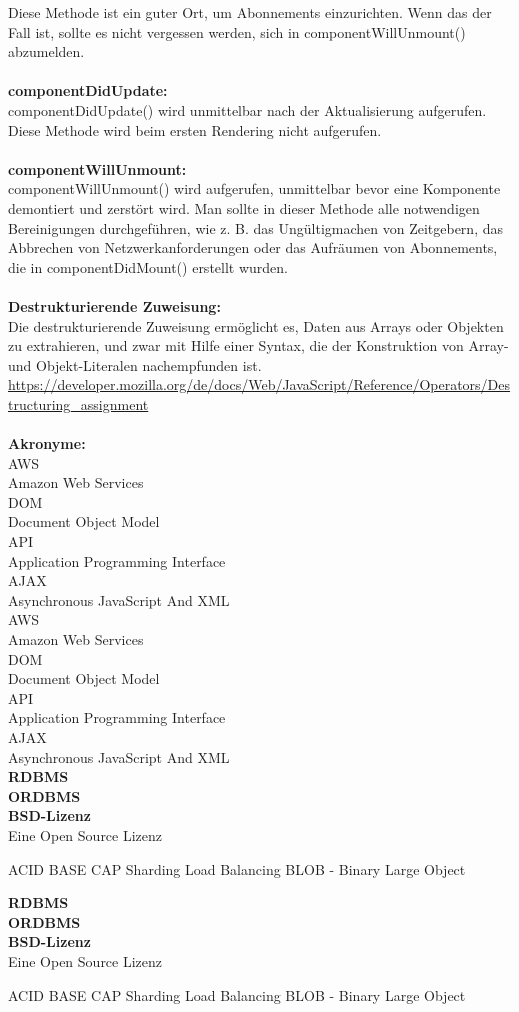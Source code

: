 Diese Methode ist ein guter Ort, um Abonnements einzurichten. Wenn das der Fall ist, sollte es nicht vergessen werden, sich in componentWillUnmount() abzumelden.
\\\\
\textbf{componentDidUpdate:}\\
componentDidUpdate() wird unmittelbar nach der Aktualisierung aufgerufen. Diese Methode wird beim ersten Rendering nicht aufgerufen.
\\\\
\textbf{componentWillUnmount:}\\
componentWillUnmount() wird aufgerufen, unmittelbar bevor eine Komponente demontiert und zerstört wird. Man sollte in dieser Methode alle notwendigen Bereinigungen durchgeführen, wie z. B. das Ungültigmachen von Zeitgebern, das Abbrechen von Netzwerkanforderungen oder das Aufräumen von Abonnements, die in componentDidMount() erstellt wurden.
\\\\
\textbf{Destrukturierende Zuweisung:}\\
Die destrukturierende Zuweisung ermöglicht es, Daten aus Arrays oder Objekten zu extrahieren, und zwar mit Hilfe einer Syntax, die der Konstruktion von Array- und Objekt-Literalen nachempfunden ist.
\url{https://developer.mozilla.org/de/docs/Web/JavaScript/Reference/Operators/Destructuring_assignment}
\\\\
\textbf{Akronyme:}\\
{AWS}\\{Amazon Web Services}\\
{DOM}\\{Document Object Model}\\
{API}\\{Application Programming Interface}\\
{AJAX}\\{Asynchronous JavaScript And XML}\\
{AWS}\\{Amazon Web Services}\\
{DOM}\\{Document Object Model}\\
{API}\\{Application Programming Interface}\\
{AJAX}\\{Asynchronous JavaScript And XML}\\

\textbf{RDBMS}\\
\textbf{ORDBMS}\\
\textbf{BSD-Lizenz}\\
Eine Open Source Lizenz

ACID
BASE
CAP
Sharding
Load Balancing
BLOB - Binary Large Object

\textbf{RDBMS}\\
\textbf{ORDBMS}\\
\textbf{BSD-Lizenz}\\
Eine Open Source Lizenz

ACID
BASE
CAP
Sharding
Load Balancing
BLOB - Binary Large Object

